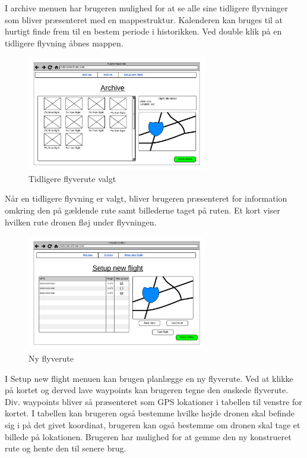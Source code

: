 I archive menuen har brugeren mulighed for at se alle sine tidligere flyvninger som bliver præsenteret med en mappestruktur. Kalenderen kan bruges til at hurtigt finde frem til en bestem periode i historikken. Ved double klik på en tidligere flyvning åbnes mappen.

\vspace{-5pt}
\begin{figure}[H]
	\centering
	\includegraphics[width=0.7\textwidth]{Billeder/UI_mockups/archive_choosen.png}
	\vspace{-5pt}
	\caption{Tidligere flyverute valgt}
	\label{fig:mockup_archive_choosen}
\end{figure}

Når en tidligere flyvning er valgt, bliver brugeren præsenteret for information omkring den på gældende rute samt billederne taget på ruten. Et kort viser hvilken rute dronen fløj under flyvningen.

\vspace{-5pt}
\begin{figure}[H]
	\centering
	\includegraphics[width=0.7\textwidth]{Billeder/UI_mockups/setup_new_flight.png}
	\vspace{-5pt}
	\caption{Ny flyverute}
	\label{fig:mockup_setup_new_flight}
\end{figure}

I Setup new flight menuen kan brugen planlægge en ny flyverute. Ved at klikke på kortet og derved lave waypoints kan brugeren tegne den ønskede flyverute. Div. waypoints bliver så præsenteret som GPS lokationer i tabellen til venstre for kortet. I tabellen kan brugeren også bestemme hvilke højde dronen skal befinde sig i på det givet koordinat, brugeren kan også bestemme om dronen skal tage et billede på lokationen. Brugeren har mulighed for at gemme den ny konstrueret rute og hente den til senere brug. 